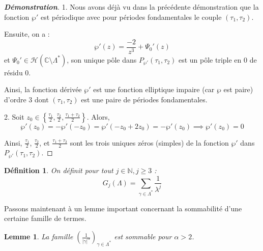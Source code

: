 \documentclass[12pt]{article}
\newtheorem{lemma}{Lemme}
\newtheorem{definition}{Définition}
\begin{document}
            \begin{proof}[\textbf{Démonstration}]
            1. Nous avons déjà vu dans la précédente démonstration que la fonction \(\wp'\) est périodique avec pour périodes fondamentales le couple \((\tau_1, \tau_2)\).

            Ensuite, on a :
            \[
            \wp'(z) = \frac{-2}{z^3} + \Psi_0'(z)
            \]
            et \(\Psi_0' \in \mathcal{H}(\mathbb{C} \setminus \Lambda^*)\), son unique pôle dans \(P_{\wp'} (\tau_1, \tau_2)\) est un pôle triple en 0 de résidu 0.

            Ainsi, la fonction dérivée \(\wp'\) est une fonction elliptique impaire (car \(\wp\) est paire) d'ordre 3 dont \((\tau_1, \tau_2)\) est une paire de périodes fondamentales.

            2. Soit \(z_0 \in \left\{ \frac{\tau_1}{2}, \frac{\tau_2}{2}, \frac{\tau_1 + \tau_2}{2} \right\}\). Alors,
            \[
            \wp'(z_0) = -\wp'(-z_0) = \wp'(-z_0 + 2z_0) = -\wp'(z_0) \implies \wp'(z_0) = 0
            \]

            Ainsi, \(\frac{\tau_1}{2}\), \(\frac{\tau_2}{2}\), et \(\frac{\tau_1 + \tau_2}{2}\) sont les trois uniques zéros (simples) de la fonction \(\wp'\) dans \(P_{\wp'} (\tau_1, \tau_2)\).
            \end{proof}
            \begin{definition}
                On définit pour tout \(j \in \mathbb{N}, j \geq 3\) :
                \[
                G_j(\Lambda) = \sum_{\gamma \in \Lambda^*} \frac{1}{\lambda^j}
                \]
                \end{definition}

                Passons maintenant à un lemme important concernant la sommabilité d'une certaine famille de termes.

                \begin{lemma}
                La famille \(\left( \frac{1}{|\gamma|^\alpha} \right)_{\gamma \in \Lambda^*}\) est sommable pour \(\alpha > 2\).
                \end{lemma}
\end{document}
